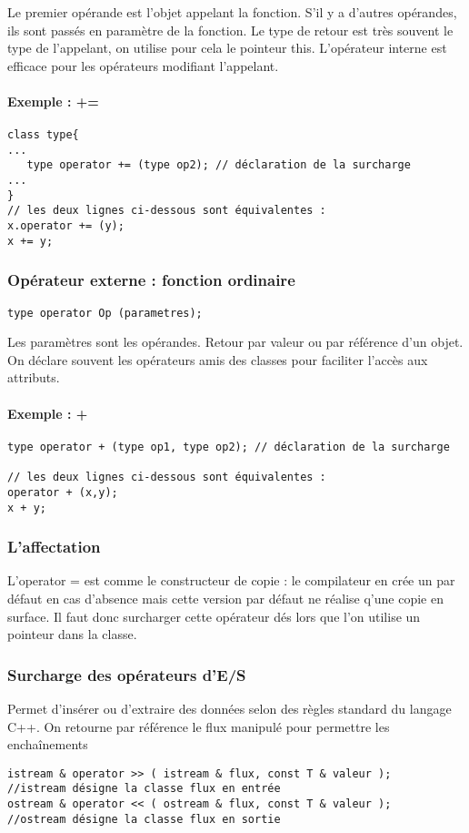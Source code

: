 \documentclass[10pt,a4paper,twoside]{article}
\begin{document}
Le premier opérande est l'objet appelant la fonction. S'il y a d'autres opérandes, ils sont passés en paramètre de la fonction. Le type de retour est très souvent le type de l'appelant, on utilise pour cela le pointeur this. L'opérateur interne est efficace pour les opérateurs modifiant l'appelant.

\paragraph{Exemple : +=}
\begin{verbatim}
class type{
...
   type operator += (type op2); // déclaration de la surcharge
...
}
// les deux lignes ci-dessous sont équivalentes :
x.operator += (y);
x += y;
\end{verbatim}

\subsubsection{Opérateur externe : fonction ordinaire}
\begin{verbatim}
type operator Op (parametres);
\end{verbatim}

Les paramètres sont les opérandes. Retour par valeur ou par référence d'un objet. On déclare souvent les opérateurs amis des classes pour faciliter l'accès aux attributs.

\paragraph{Exemple : +}
\begin{verbatim}
type operator + (type op1, type op2); // déclaration de la surcharge

// les deux lignes ci-dessous sont équivalentes :
operator + (x,y);
x + y;
\end{verbatim}

\subsubsection{L'affectation}
L'operator = est comme le constructeur de copie : le compilateur en crée un par défaut en cas d'absence mais cette version par défaut ne réalise q'une copie en surface. Il faut donc surcharger cette opérateur dés lors que l'on utilise un pointeur dans la classe.

\subsubsection{Surcharge des opérateurs d'E/S}
Permet d'insérer ou d'extraire des données selon des règles standard du langage C++. On retourne par référence le flux manipulé pour permettre les enchaînements
\begin{verbatim}
istream & operator >> ( istream & flux, const T & valeur );
//istream désigne la classe flux en entrée
ostream & operator << ( ostream & flux, const T & valeur );
//ostream désigne la classe flux en sortie
\end{verbatim}
\end{document}
